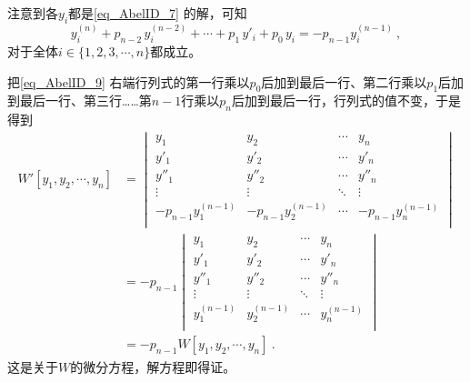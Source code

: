 注意到各$y_i$都是\autoref{eq_AbelID_7} 的解，可知
\begin{equation}
y_i^{(n)}  + p_{n-2}\,y_i^{(n-2)} + \cdots + p_1\,y'_i + p_0\,y_i = -p_{n-1}y_i^{(n-1)}~,
\end{equation}
对于全体$i\in\{1, 2, 3, \cdots, n\}$都成立。

把\autoref{eq_AbelID_9}  右端行列式的第一行乘以$p_0$后加到最后一行、第二行乘以$p_1$后加到最后一行、第三行……第$n-1$行乘以$p_n$后加到最后一行，行列式的值不变，于是得到
\begin{equation}\label{eq_AbelID_10}
\begin{aligned}
W'[y_1, y_2, \cdots, y_n] &= 
\begin{vmatrix}
y_1&y_2&\cdots&y_n\\
y'_1&y'_2&\cdots&y'_n\\
y''_1&y''_2&\cdots&y''_n\\
\vdots&\vdots&\ddots&\vdots\\
-p_{n-1}y_1^{(n-1)}&-p_{n-1}y_2^{(n-1)}&\cdots&-p_{n-1}y_n^{(n-1)}\\
\end{vmatrix}\\
&=-p_{n-1}
\begin{vmatrix}
y_1&y_2&\cdots&y_n\\
y'_1&y'_2&\cdots&y'_n\\
y''_1&y''_2&\cdots&y''_n\\
\vdots&\vdots&\ddots&\vdots\\
y_1^{(n-1)}&y_2^{(n-1)}&\cdots&y_n^{(n-1)}\\
\end{vmatrix}\\
&= -p_{n-1}W[y_1, y_2, \cdots, y_n]~.
\end{aligned}
\end{equation}
这是关于$W$的微分方程，解方程即得证。















